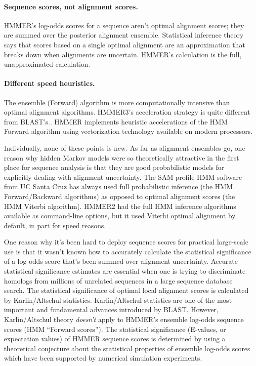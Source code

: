 \paragraph{Sequence scores, not alignment scores.} HMMER's
  log-odds scores for a sequence aren't optimal alignment scores; they
  are summed over the posterior alignment ensemble. Statistical
  inference theory says that scores based on a single optimal
  alignment are an approximation that breaks down when alignments are
  uncertain. HMMER's calculation is the full, unapproximated
  calculation.
 
\paragraph{Different speed heuristics.} The ensemble (Forward) algorithm is more
  computationally intensive than optimal alignment algorithms.
  HMMER3's acceleration strategy is quite different from
  BLAST's.\cite{Eddy11}.  HMMER implements heuristic accelerations of
  the HMM Forward algorithm using vectorization technology available
  on modern processors.\vspace{1em}

Individually, none of these points is new. As far as alignment
ensembles go, one reason why hidden Markov models were so
theoretically attractive in the first place for sequence analysis is
that they are good probabilistic models for explicitly dealing with
alignment uncertainty. The SAM profile HMM software from UC Santa Cruz
has always used full probabilistic inference (the HMM Forward/Backward
algorithms) as opposed to optimal alignment scores (the HMM Viterbi
algorithm). HMMER2 had the full HMM inference algorithms available as
command-line options, but it used Viterbi optimal alignment by
default, in part for speed reasons.

One reason why it's been hard to deploy sequence scores for practical
large-scale use is that it wasn't known how to accurately calculate
the statistical significance of a log-odds score that's been summed
over alignment uncertainty. Accurate statistical significance
estimates are essential when one is trying to discriminate homologs
from millions of unrelated sequences in a large sequence database
search. The statistical significance of optimal local alignment scores
is calculated by Karlin/Altschul statistics.\cite{Karlin90}
Karlin/Altschul statistics are one of the most important and
fundamental advances introduced by BLAST.  However, Karlin/Altschul
theory \emph{doesn't} apply to HMMER's ensemble log-odds sequence
scores (HMM ``Forward scores''). The statistical significance
(E-values, or expectation values) of HMMER sequence scores is
determined by using a theoretical conjecture about the statistical
properties of ensemble log-odds scores which have been supported by
numerical simulation experiments.\cite{Eddy08}

